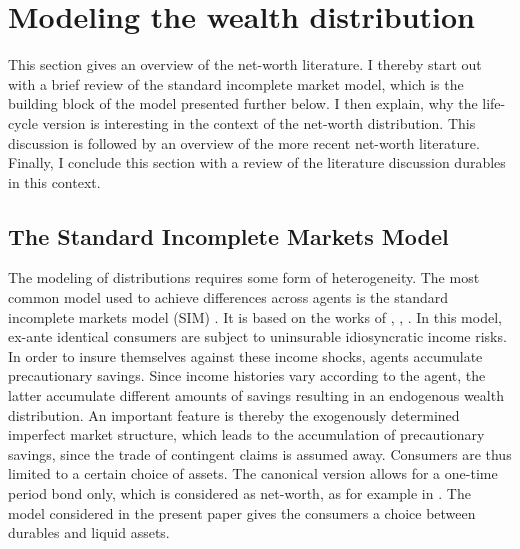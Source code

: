\documentclass[12pt,a4paper,leqno]{article}
\theoremstyle{definition}
\begin{document}
\section{Modeling the wealth distribution}
This section gives an overview of the net-worth literature. I thereby start out with a brief review of the standard incomplete market model, which is the building block of the model presented further below. I then explain, why the life-cycle version is interesting in the context of the net-worth distribution. This discussion is followed by an overview of the more recent net-worth literature. Finally, I conclude this section with a review of the literature discussion durables in this context. 

\label{Modeling the wealth distribution}
\subsection{The Standard Incomplete Markets Model}
The modeling of distributions requires some form of heterogeneity. The most common model used to achieve differences across agents is the standard incomplete markets model (SIM)   \citep{heathcote2009quantitative}. It is based on the works of \cite{bewley1977permanent}, \cite{aiyagari1994}, \cite{huggett1993risk}. In this model, ex-ante identical consumers are subject to uninsurable idiosyncratic income risks. In order to insure themselves against these income shocks, agents accumulate precautionary savings. Since income histories vary according to the agent, the latter accumulate different amounts of savings resulting in an endogenous wealth distribution. An important feature is thereby the exogenously determined imperfect market structure, which leads to the accumulation of precautionary savings, since the trade of contingent claims is assumed away. Consumers are thus limited to a certain choice of assets. The canonical version allows for a one-time period bond only, which is considered as net-worth, as for example in \cite{hintermaier2011}. The model considered in the present paper gives the consumers a choice between durables and liquid assets. 
\end{document}
